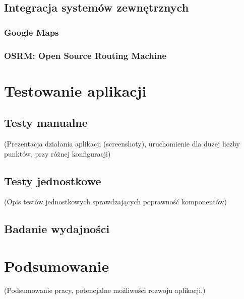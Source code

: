 \documentclass[12pt,a4paper]{report}
\begin{document}
		\section{Integracja systemów zewnętrznych}
			
			\subsection{Google Maps}
			
			\subsection{OSRM: Open Source Routing Machine}
			
	\chapter{Testowanie aplikacji}
	\section{Testy manualne}
	(Prezentacja działania aplikacji (screenshoty), uruchomienie dla dużej liczby punktów, przy różnej konfiguracji)
	\section{Testy jednostkowe}
	\label{sec:testy_jednostkowe}
	(Opis testów jednostkowych sprawdzających poprawność komponentów)
	\section{Badanie wydajności}\label{sec:wydajnosc}
	
	\chapter*{Podsumowanie}
		(Podsumowanie pracy, potencjalne możliwości rozwoju aplikacji.)
		
	
	
\end{document}
